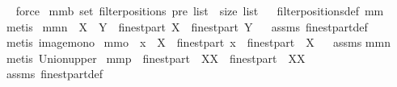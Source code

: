 \begin{isabellebody}
\isadelimproof
\ %
\endisadelimproof
%
\isatagproof
{}\isamarkupfalse%
\ force%
\endisatagproof
{\isafoldproof}%
%
\isadelimproof
%
\endisadelimproof
\isanewline
{}\isamarkupfalse%
\ mm{}{}b{\isacharcolon}\ {\isachardoublequoteopen}set\ {\isacharparenleft}filterpositions{}\ pre\ list{\isacharparenright}\ {\isasymsubseteq}\ {\isacharbraceleft}{}{\isachardot}{\isachardot}{\isacharless}size\ list{\isacharbraceright}{\isachardoublequoteclose}%
\isadelimproof
\ %
\endisadelimproof
%
\isatagproof
{}\isamarkupfalse%
\ filterpositions{}{\isacharunderscore}def\ mm{}{}\ \isamarkupfalse%
\ metis%
\endisatagproof
{\isafoldproof}%
%
\isadelimproof
%
\endisadelimproof
\isanewline
\isanewline
{}\isamarkupfalse%
\ mm{}{}n{\isacharcolon}\ \ {\isachardoublequoteopen}X\ {\isasymsubseteq}\ Y{\isachardoublequoteclose}\ \ {\isachardoublequoteopen}finestpart\ X\ {\isasymsubseteq}\ finestpart\ Y{\isachardoublequoteclose}%
\isadelimproof
\ %
\endisadelimproof
%
\isatagproof
{}\isamarkupfalse%
\ assms\ finestpart{\isacharunderscore}def\ \isamarkupfalse%
\ {\isacharparenleft}metis\ image{\isacharunderscore}mono{\isacharparenright}%
\endisatagproof
{\isafoldproof}%
%
\isadelimproof
%
\endisadelimproof
\isanewline
{}\isamarkupfalse%
\ mm{}{}o{\isacharcolon}\ \ {\isachardoublequoteopen}x\ {\isasymin}\ X{\isachardoublequoteclose}\ \ {\isachardoublequoteopen}finestpart\ x\ {\isasymsubseteq}\ finestpart\ {\isacharparenleft}{\isasymUnion}\ X{\isacharparenright}{\isachardoublequoteclose}%
\isadelimproof
\ %
\endisadelimproof
%
\isatagproof
{}\isamarkupfalse%
\ assms\isanewline
mm{}{}n\ \isamarkupfalse%
\ {\isacharparenleft}metis\ Union{\isacharunderscore}upper{\isacharparenright}%
\endisatagproof
{\isafoldproof}%
%
\isadelimproof
%
\endisadelimproof
\isanewline
{}\isamarkupfalse%
\ mm{}{}p{\isacharcolon}\ {\isachardoublequoteopen}{\isasymUnion}\ {\isacharparenleft}finestpart\ {\isacharbackquote}\ XX{\isacharparenright}\ {\isasymsubseteq}\ finestpart\ {\isacharparenleft}{\isasymUnion}\ XX{\isacharparenright}{\isachardoublequoteclose}%
\isadelimproof
\ %
\endisadelimproof
%
\isatagproof
{}\isamarkupfalse%
\ assms\ finestpart{\isacharunderscore}def\ \isanewline

\end{isabellebody}
